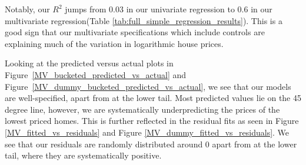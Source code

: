 Notably, our $R^2$ jumps from 0.03 in our univariate regression to 0.6 in our multivariate regression(Table \ref{tab:full_simple_regression_results}).
This is a good sign that our multivariate specifications which include controls are explaining much of the variation in logarithmic house prices.

Looking at the predicted versus actual plots in Figure~\ref{MV_bucketed_predicted_vs_actual} and Figure~\ref{MV_dummy_bucketed_predicted_vs_actual}, we see that our models are well-specified, apart from at the lower tail.
Most predicted values lie on the 45 degree line, however, we are systematically underpredicting the prices of the lowest priced homes. This is further reflected in the residual fits
as seen in Figure \ref{MV_fitted_vs_residuals} and Figure \ref{MV_dummy_fitted_vs_residuals}. We see that our residuals are randomly distributed around 0 apart from at the lower tail, where they are systematically positive.